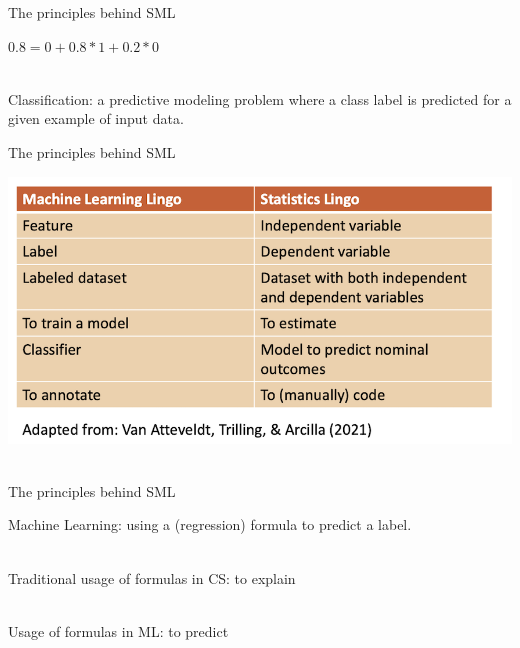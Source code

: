 \documentclass[handout]{beamer}
\begin{document}
	\begin{frame}{The principles behind SML} 
		
		\(0.8 = 0 + 0.8 * 1 + 0.2 * 0\) \\\
		
		Classification: a predictive modeling problem where a class label is predicted for a given example of input data. 
		
		
		
		
		
		
	\end{frame}
	
	
	\begin{frame}{The principles behind SML}
		
		\begin{center}
			\includegraphics[width=\linewidth,height=\textheight,keepaspectratio]{../pictures/MLlingo.png} \\\
		\end{center}
		
		
		
	\end{frame}
	
	
	\begin{frame}{The principles behind SML} 
		
		Machine Learning: using a (regression) formula to predict a label. \\\
		
		Traditional usage of formulas in CS: to explain \\\
		
		Usage of formulas in ML: to predict \\\
		
		
		
		
	\end{frame}
	
\end{document}
